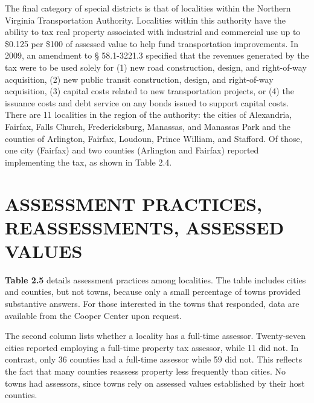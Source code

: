 \documentclass[
]{book}
\begin{document}
The final category of special districts is that of localities within the Northern Virginia Transportation Authority. Localities within this authority have the ability to tax real property associated with industrial and commercial use up
to \$0.125 per \$100 of assessed value to help fund transportation improvements. In 2009, an amendment to § 58.1-3221.3 specified that the revenues generated by the tax were to be used solely for (1) new road construction, design, and right-of-way acquisition, (2) new public transit construction, design, and right-of-way acquisition, (3) capital costs related to new transportation projects, or (4) the issuance costs and debt service on any bonds issued to support capital costs. There are 11 localities in the region of the authority: the cities of Alexandria, Fairfax, Falls Church, Fredericksburg, Manassas, and Manassas Park and the counties of Arlington, Fairfax, Loudoun, Prince William, and Stafford. Of those, one city (Fairfax) and two counties (Arlington and Fairfax) reported implementing the tax, as shown in Table 2.4.

\hypertarget{assessment-practices-reassessments-assessed-values}{%
\section{ASSESSMENT PRACTICES, REASSESSMENTS, ASSESSED VALUES}\label{assessment-practices-reassessments-assessed-values}}

\textbf{Table 2.5} details assessment practices among localities. The table includes cities and counties, but not towns, because only a small percentage of towns provided substantive answers. For those interested in the towns that responded, data are available from the Cooper Center upon request.

The second column lists whether a locality has a full-time assessor. Twenty-seven cities reported employing a full-time property tax assessor, while 11 did not. In contrast, only 36 counties had a full-time assessor while 59 did not. This reflects the fact that many counties reassess property less frequently than cities. No towns had assessors, since towns rely on assessed values established by their host counties.
\end{document}
